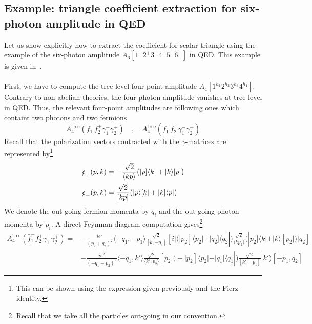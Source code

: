 \subsection*{Example: triangle coefficient extraction for six-photon amplitude in QED}
Let us show explicitly how to extract the coefficient for scalar triangle using the example of the six-photon amplitude $A_6[1^-2^+3^-4^+5^-6^+]$ in QED.
This example is given in~\cite{Forde:2007mi}.
\\\\
First, we have to compute the tree-level four-point amplitude $A_4[1^{h_1}2^{h_2}3^{h_3}4^{h_4}]$. 
Contrary to non-abelian theories, the four-photon amplitude vanishes at tree-level in QED.
Thus, the relevant four-point amplitudes are following ones which containt two photons and two fermions
\begin{equation*}
A_4^{\mathrm{tree}}(\bar{f}_1^- f_2^+ \gamma_1^-\gamma_2^+)
\quad,\quad
A_4^{\mathrm{tree}}(\bar{f}_1^+ f_2^- \gamma_1^-\gamma_2^+)
\end{equation*}
Recall that the polarization vectors contracted with the $\gamma$-matrices are represented by\footnote{This can be shown using the expression given previously and the Fierz identity.}
\begin{equation*}
\begin{split}
& \slashed{\epsilon}_+(p,k) = -\frac{\sqrt{2}}{\langle kp\rangle}\big(|p]\langle k| + |k\rangle[p|\big)
\\
& \slashed{\epsilon}_-(p,k) = \frac{\sqrt{2}}{[kp]}\big(|p\rangle [k| + |k]\langle p|\big)
\end{split}
\end{equation*}
We denote the out-going fermion momenta by $q_i$ and the out-going photon momenta by $p_i$. 
A direct Feynman diagram computation gives\footnote{Recall that we take all the particles out-going in our convention.}
\begin{equation*}
\begin{split}
A_{4}^{\mathrm{tree}}(\bar{f}_1^- f_2^+ \gamma_1^-\gamma_2^+) 
= &
-\frac{ie^2}{(p_2+q_2)^2}\langle -q_1, -p_1\rangle \frac{\sqrt{2}}{[k, -p_1]}
[i|\big(|p_2] \langle p_2| + |q_2]\langle q_2|\big)
\frac{\sqrt{2}}{\langle k p_2\rangle}
\big(|p_2]\langle k| + |k\rangle[p_2|\big) |q_2]
\\
&
-\frac{ie^2}{(-q_1-p_2)^2}\langle -q_1, k'\rangle
\frac{\sqrt{2}}{\langle k', p_2\rangle}[p_2|
\big( -|p_2]\langle p_2| - |q_1]\langle q_1|\big)
\frac{\sqrt{2}}{[k', -p_1]}|k'\rangle [-p_1, q_2]
\end{split}
\end{equation*}
